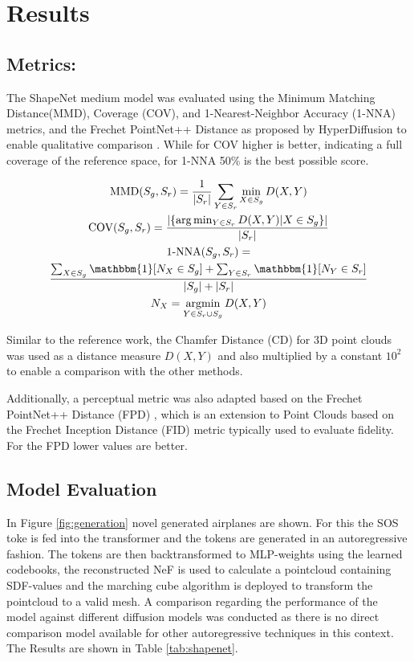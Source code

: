 


\section{Results}

\subsection*{Metrics: }

The ShapeNet medium model was evaluated using the Minimum Matching Distance(MMD), Coverage (COV), and 1-Nearest-Neighbor Accuracy (1-NNA) metrics, and the Frechet PointNet++ Distance as proposed by HyperDiffusion to enable qualitative comparison \cite{erkoç2023hyperdiffusion}.
While for COV higher is better, indicating a full coverage of the reference space, for 1-NNA 50\% is the best possible score.

\begin{gather*}
  \mathrm{MMD}(S_g,S_r) =\frac{1}{|S_{r}|}\sum_{Y\in S_{r}}\min_{X\in S_{g}}D(X,Y)\\
  \text{COV}(S_g,S_r) =\frac{|\{\arg\min_{Y\in S_r}D(X,Y)|X\in S_g\}|}{|S_r|}\\
  \text{1-NNA}(S_g,S_r) =\\
  \frac{\sum_{X\in S_g}\mathbbm{1}[N_X\in S_g]+\sum_{Y\in S_r}\mathbbm{1}[N_Y\in S_r]}{|S_g|+|S_r|}\\
  N_X = \underset{Y\in S_r \cup S_g}{\text{argmin}} \, D(X,Y) \\
\end{gather*}

Similar to the reference work, the Chamfer Distance (CD) for 3D point clouds was used as a distance measure $D(X, Y)$ and also multiplied by a constant $10^2$ to enable a comparison with the other methods.

Additionally, a perceptual metric was also adapted based on the Frechet PointNet++ Distance (FPD) \cite{qi2017pointnetdeephierarchicalfeature}, which is an extension to Point Clouds based on the Frechet Inception Distance (FID) metric \cite{NIPS2017_8a1d6947} typically used to evaluate fidelity. For the FPD lower values are better.

\subsection*{Model Evaluation}
In Figure \ref{fig:generation} novel generated airplanes are shown. For this the SOS toke is fed into the transformer and the tokens are generated in an autoregressive fashion. The tokens are then backtransformed to MLP-weights using the learned codebooks, the reconstructed NeF is used to calculate a pointcloud containing SDF-values and the marching cube algorithm is deployed to transform the pointcloud to a valid mesh.
A comparison regarding the performance of the model against different diffusion models was conducted as there is no direct comparison model available for other autoregressive techniques in this context. The Results are shown in Table \ref{tab:shapenet}.

